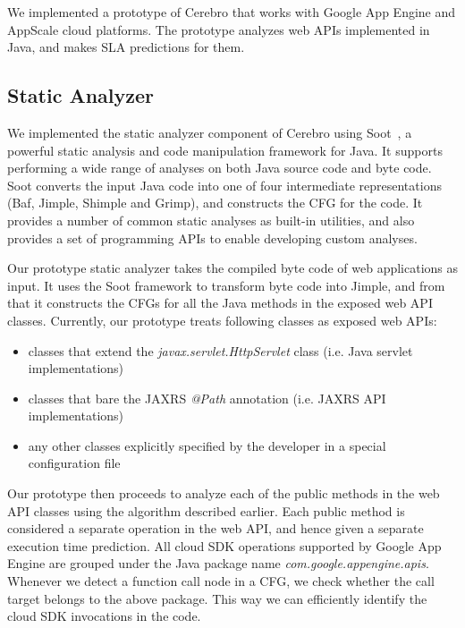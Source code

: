 We implemented a prototype of Cerebro that works with Google App Engine and AppScale cloud platforms.
The prototype analyzes web APIs implemented in Java, and makes SLA predictions for them.

\subsection{Static Analyzer}
We implemented the static analyzer component of Cerebro using Soot~\cite{Vallee-Rai:2010:SJB:1925805.1925818}, a powerful
static analysis and code manipulation framework for Java. It supports performing a wide range of analyses on both Java source
code and byte code. Soot converts the input Java code into one of four intermediate representations (Baf, Jimple,
 Shimple and Grimp), and constructs the CFG for the code. It provides a number of common static
 analyses as built-in utilities, and also provides a set of programming APIs to enable developing custom
 analyses.
 
Our prototype static analyzer takes the compiled byte code of web applications as input. It uses the
Soot framework to transform byte code into Jimple, and from that it constructs the CFGs for 
all the Java methods in the exposed web API classes. Currently, our
prototype treats following classes as exposed web APIs:

\begin{itemize}
\item classes that extend the \textit{javax.servlet.HttpServlet} class (i.e. Java servlet implementations)
\item classes that bare the JAXRS \textit{@Path} annotation (i.e. JAXRS API implementations)
\item any other classes explicitly specified by the developer in a special configuration file
\end{itemize}
 
Our prototype then proceeds to analyze each of the public methods in the web API classes
using the algorithm described earlier. Each public method is considered a separate operation
in the web API, and hence given a separate execution time prediction.
All cloud SDK operations supported by Google App Engine
are grouped under the Java package name \textit{com.google.appengine.apis}. Whenever we detect
a function call node in a CFG, we check whether the call target belongs to the above package.
This way we can efficiently identify the cloud SDK invocations in the code.

